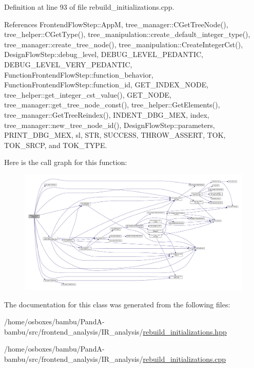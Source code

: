 Definition at line 93 of file rebuild\+\_\+initializations.\+cpp.



References Frontend\+Flow\+Step\+::\+AppM, tree\+\_\+manager\+::\+C\+Get\+Tree\+Node(), tree\+\_\+helper\+::\+C\+Get\+Type(), tree\+\_\+manipulation\+::create\+\_\+default\+\_\+integer\+\_\+type(), tree\+\_\+manager\+::create\+\_\+tree\+\_\+node(), tree\+\_\+manipulation\+::\+Create\+Integer\+Cst(), Design\+Flow\+Step\+::debug\+\_\+level, D\+E\+B\+U\+G\+\_\+\+L\+E\+V\+E\+L\+\_\+\+P\+E\+D\+A\+N\+T\+IC, D\+E\+B\+U\+G\+\_\+\+L\+E\+V\+E\+L\+\_\+\+V\+E\+R\+Y\+\_\+\+P\+E\+D\+A\+N\+T\+IC, Function\+Frontend\+Flow\+Step\+::function\+\_\+behavior, Function\+Frontend\+Flow\+Step\+::function\+\_\+id, G\+E\+T\+\_\+\+I\+N\+D\+E\+X\+\_\+\+N\+O\+DE, tree\+\_\+helper\+::get\+\_\+integer\+\_\+cst\+\_\+value(), G\+E\+T\+\_\+\+N\+O\+DE, tree\+\_\+manager\+::get\+\_\+tree\+\_\+node\+\_\+const(), tree\+\_\+helper\+::\+Get\+Elements(), tree\+\_\+manager\+::\+Get\+Tree\+Reindex(), I\+N\+D\+E\+N\+T\+\_\+\+D\+B\+G\+\_\+\+M\+EX, index, tree\+\_\+manager\+::new\+\_\+tree\+\_\+node\+\_\+id(), Design\+Flow\+Step\+::parameters, P\+R\+I\+N\+T\+\_\+\+D\+B\+G\+\_\+\+M\+EX, sl, S\+TR, S\+U\+C\+C\+E\+SS, T\+H\+R\+O\+W\+\_\+\+A\+S\+S\+E\+RT, T\+OK, T\+O\+K\+\_\+\+S\+R\+CP, and T\+O\+K\+\_\+\+T\+Y\+PE.

Here is the call graph for this function\+:
\nopagebreak
\begin{figure}[H]
\begin{center}
\leavevmode
\includegraphics[width=350pt]{de/d85/classrebuild__initialization_ac95e61c5c62f6c0a5b4ce1557b32ae4f_cgraph}
\end{center}
\end{figure}


The documentation for this class was generated from the following files\+:\begin{DoxyCompactItemize}
\item 
/home/osboxes/bambu/\+Pand\+A-\/bambu/src/frontend\+\_\+analysis/\+I\+R\+\_\+analysis/\hyperlink{rebuild__initializations_8hpp}{rebuild\+\_\+initializations.\+hpp}\item 
/home/osboxes/bambu/\+Pand\+A-\/bambu/src/frontend\+\_\+analysis/\+I\+R\+\_\+analysis/\hyperlink{rebuild__initializations_8cpp}{rebuild\+\_\+initializations.\+cpp}\end{DoxyCompactItemize}
